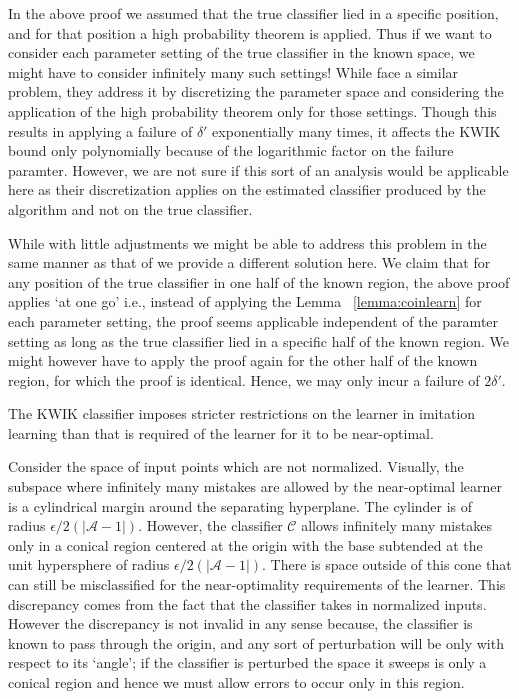\begin{remark}
In the above proof we assumed that the true classifier lied in a specific position, and for that position a high probability theorem is applied. Thus if we want to consider each parameter setting of the true classifier in the known space, we might have to consider infinitely many such settings! While \citet{DBLP:conf/nips/StrehlL07} face a similar problem, they address it by discretizing the parameter space and considering the application of the high probability theorem only for those settings. Though this results in applying a failure of $\delta'$ exponentially many times, it affects the KWIK bound only polynomially because of the logarithmic factor on the failure paramter. However, we are not sure if this sort of an analysis would be applicable here as their discretization applies on the estimated classifier produced by the algorithm and not on the true classifier. 

While with little adjustments we might be able to address this problem in the same manner as that of \citet{DBLP:conf/nips/StrehlL07} we provide a different solution here. We claim that for any position of the true classifier in one half of the known region, the above proof applies `at one go' i.e., instead of applying the Lemma ~\ref{lemma:coinlearn} for each parameter setting, the proof seems applicable independent of the paramter setting as long as the true classifier lied in a specific half of the known region. We might however have to apply the proof again for the other half of the known region, for which the proof is identical. Hence, we may only incur a failure of $2\delta'$. \\
 
\end{remark}




\begin{remark}
The KWIK classifier imposes stricter restrictions on the learner in imitation learning than that is required of the learner for it to be near-optimal. 
\end{remark}
Consider the space of input points which are not normalized. Visually, the subspace where infinitely many mistakes are allowed by the near-optimal learner is a cylindrical margin around the separating hyperplane. The cylinder is of radius $\epsilon/2(|\mathcal{A}-1|)$. However, the classifier $\mathcal{C}$ allows infinitely many mistakes only in a conical region centered at the origin with the base subtended at the unit hypersphere of radius $\epsilon/2(|\mathcal{A}-1|)$. There is space outside of this cone that can still be misclassified for the near-optimality requirements of the learner. This discrepancy comes from the fact that the classifier takes in normalized inputs.
However the discrepancy is not invalid in any sense because,  the classifier is known to pass through the origin, and any sort of perturbation will be only with respect to its `angle'; if the classifier is perturbed the space it sweeps is only a conical region and hence we must allow errors to occur only in this region. \\
